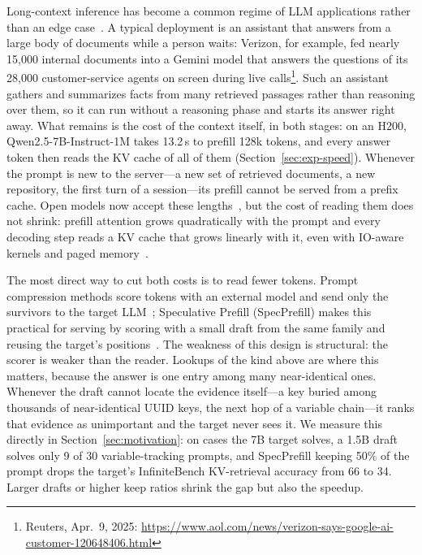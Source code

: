 \documentclass[10pt,conference]{IEEEtran}
\begin{document}
Long-context inference has become a common regime of LLM applications rather than an edge case~\cite{bai2024longbench,ruler2024}. A typical deployment is an assistant that answers from a large body of documents while a person waits: Verizon, for example, fed nearly 15{,}000 internal documents into a Gemini model that answers the questions of its 28{,}000 customer-service agents on screen during live calls\footnote{Reuters, Apr.~9, 2025: \url{https://www.aol.com/news/verizon-says-google-ai-customer-120648406.html}}. Such an assistant gathers and summarizes facts from many retrieved passages rather than reasoning over them, so it can run without a reasoning phase and starts its answer right away. What remains is the cost of the context itself, in both stages: on an H200, Qwen2.5-7B-Instruct-1M takes 13.2\,s to prefill 128k tokens, and every answer token then reads the KV cache of all of them (Section~\ref{sec:exp-speed}). Whenever the prompt is new to the server---a new set of retrieved documents, a new repository, the first turn of a session---its prefill cannot be served from a prefix cache. Open models now accept these lengths~\cite{qwen25_1m}, but the cost of reading them does not shrink: prefill attention grows quadratically with the prompt and every decoding step reads a KV cache that grows linearly with it, even with IO-aware kernels and paged memory~\cite{dao2022flashattention,dao2024flashattention2,kwon2023efficient}.

The most direct way to cut both costs is to read fewer tokens. Prompt compression methods score tokens with an external model and send only the survivors to the target LLM~\cite{li2023selective,jiang2023llmlingua,jiang2024longllmlingua}; Speculative Prefill (SpecPrefill) makes this practical for serving by scoring with a small draft from the same family and reusing the target's positions~\cite{liu2025specprefill,upasani2026crossfamily}. The weakness of this design is structural: the scorer is weaker than the reader. Lookups of the kind above are where this matters, because the answer is one entry among many near-identical ones. Whenever the draft cannot locate the evidence itself---a key buried among thousands of near-identical UUID keys, the next hop of a variable chain---it ranks that evidence as unimportant and the target never sees it. We measure this directly in Section~\ref{sec:motivation}: on cases the 7B target solves, a 1.5B draft solves only 9 of 30 variable-tracking prompts, and SpecPrefill keeping 50\% of the prompt drops the target's InfiniteBench KV-retrieval accuracy from 66 to 34. Larger drafts or higher keep ratios shrink the gap but also the speedup.
\end{document}
